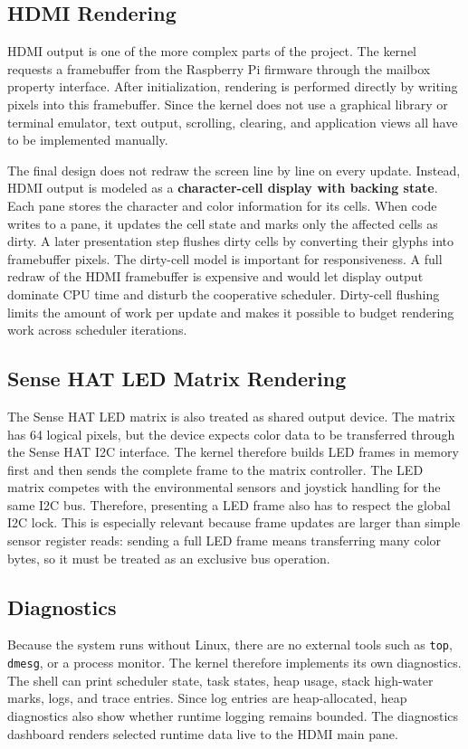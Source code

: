 \subsection{HDMI Rendering}

HDMI output is one of the more complex parts of the project. The kernel requests a framebuffer from the Raspberry Pi firmware through the mailbox property interface. After initialization, rendering is performed directly by writing pixels into this framebuffer. Since the kernel does not use a graphical library or terminal emulator, text output, scrolling, clearing, and application views all have to be implemented manually.

The final design does not redraw the screen line by line on every update. Instead, HDMI output is modeled as a \textbf{character-cell display with backing state}. Each pane stores the character and color information for its cells. When code writes to a pane, it updates the cell state and marks only the affected cells as dirty. A later presentation step flushes dirty cells by converting their glyphs into framebuffer pixels. The dirty-cell model is important for responsiveness. A full redraw of the HDMI framebuffer is expensive and would let display output dominate CPU time and disturb the cooperative scheduler. Dirty-cell flushing limits the amount of work per update and makes it possible to budget rendering work across scheduler iterations.

\subsection{Sense HAT LED Matrix Rendering}

The Sense HAT LED matrix is also treated as shared output device. The matrix has 64 logical pixels, but the device expects color data to be transferred through the Sense HAT I2C interface. The kernel therefore builds LED frames in memory first and then sends the complete frame to the matrix controller. The LED matrix competes with the environmental sensors and joystick handling for the same I2C bus. Therefore, presenting a LED frame also has to respect the global I2C lock. This is especially relevant because frame updates are larger than simple sensor register reads: sending a full LED frame means transferring many color bytes, so it must be treated as an exclusive bus operation.

\subsection{Diagnostics}

Because the system runs without Linux, there are no external tools such as \texttt{top}, \texttt{dmesg}, or a process monitor. The kernel therefore implements its own diagnostics. The shell can print scheduler state, task states, heap usage, stack high-water marks, logs, and trace entries. Since log entries are heap-allocated, heap diagnostics also show whether runtime logging remains bounded. The diagnostics dashboard renders selected runtime data live to the HDMI main pane.
